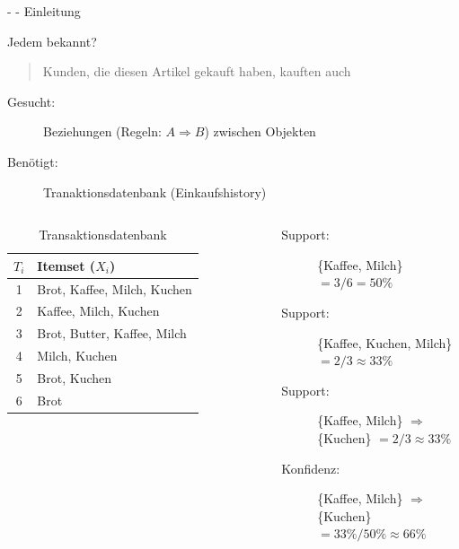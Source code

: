 \documentclass[fleqn,11pt,aspectratio=43]{beamer}
\begin{document}
\begin{frame}{\insertsectionhead - \insertsubsectionhead - Einleitung \cite{ester2000knowledge}}

\begin{alertblock}{Jedem bekannt?}
\begin{quote}
Kunden, die diesen Artikel gekauft haben, kauften auch
\end{quote}
\end{alertblock}
\pause
\begin{description}
\item[Gesucht:] Beziehungen (Regeln: $A \Rightarrow B$) zwischen Objekten
\item[Benötigt:] Tranaktionsdatenbank (Einkaufshistory)
\end{description}
\pause
\begin{columns}[onlytextwidth]
 \small
    \begin{table}
    	    \hspace{-2em}\begin{tabular}{c|l}
    	    $T_i$ & Itemset ($X_i$)\\ \hline
    	    1 & Brot, Kaffee, Milch, Kuchen\\
    	    2 & Kaffee, Milch, Kuchen\\
    	    3 & Brot, Butter, Kaffee, Milch\\
    	    4 & Milch, Kuchen\\
    	    5 & Brot, Kuchen\\
    	    6 & Brot
    	    \end{tabular}
    	    \caption{\footnotesize Transaktionsdatenbank \cite{ester2000knowledge}}
    	    \end{table}
    	    
    \vspace{-1.2em}
	   \begin{description}
		   \item[Support:] \{Kaffee, Milch\} $= 3 / 6 = 50\%$
		   \item[Support:] \{Kaffee, Kuchen, Milch\} $= 2 / 3 \approx 33\%$
		   \item[Support:] \{Kaffee, Milch\} $\Rightarrow$ \{Kuchen\}  $= 2 / 3 \approx 33\%$
		   \item[Konfidenz:] \{Kaffee, Milch\} $\Rightarrow$ \{Kuchen\} $= 33\% / 50\% \approx 66\%$
	   \end{description}
\end{columns}
\end{frame}
\end{document}
